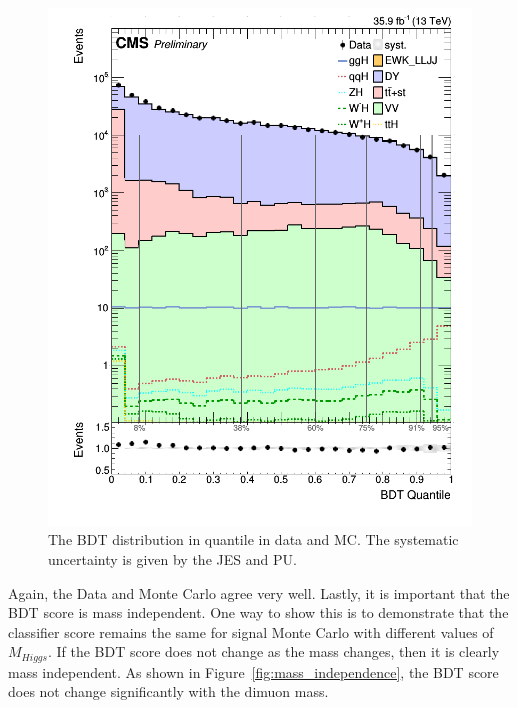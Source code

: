 \begin{figure}[hbp]
\centering
\includegraphics[width=0.7\linewidth]{figures/bdt_cats/BdtOnH_QM_bkg.png}
  \caption{The BDT distribution in quantile in data and MC. The systematic uncertainty is given by the JES and PU.}
  \label{fig:bdt_quantile}
\end{figure}

Again, the Data and Monte Carlo agree very well. Lastly, it is important that the BDT score is mass independent. One way to
show this is to demonstrate that the classifier score remains the same for signal Monte Carlo with different values of
$M_{Higgs}$. If the BDT score does not change as the mass changes, then it is clearly mass independent. As shown in
Figure~\ref{fig:mass_independence}, the BDT score does not change significantly with the dimuon mass.

